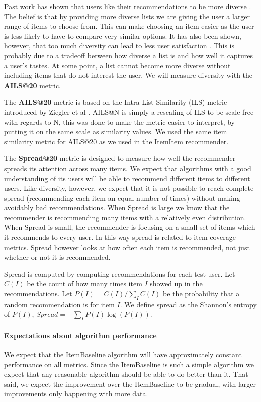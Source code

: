 \documentclass[letterpaper]{sig-alternate}
\begin{document}
  Past work has shown that users like their recommendations to be more diverse \cite{zieglerDiversity, martijnDiversity}.
  The belief is that by providing more diverse lists we are giving the user a larger range of items to choose from.
  This can make choosing an item easier as the user is less likely to have to compare very similar options.
  It has also been shown, however, that too much diversity can lead to less user satisfaction \cite{zieglerDiversity}.
  This is probably due to a tradeoff between how diverse a list is and how well it captures a user's tastes.
  At some point, a list cannot become more diverse without including items that do not interest the user.
  We will measure diversity with the {\bf AILS@20} metric.

  The {\bf AILS@20} metric is based on the Intra-List Similarity (ILS) metric introduced by Ziegler et al \cite{zieglerDiversity}.
  AILS@N is simply a rescaling of ILS to be scale free with regards to N, this was done to make the metric easier to interpret, by putting it on the same scale as similarity values.
  We used the same item similarity metric for AILS@20 as we used in the ItemItem recommender.

  The {\bf Spread@20} metric is designed to measure how well the recommender spreads its attention across many items.
  We expect that algorithms with a good understanding of its users will be able to recommend different items to different users.
  Like diversity, however, we expect that it is not possible to reach complete spread (recommending each item an equal number of times) without making avoidably bad recommendations.
  When Spread is large we know that the recommender is recommending many items with a relatively even distribution.
  When Spread is small, the recommender is focusing on a small set of items which it recommends to every user.
  In this way spread is related to item coverage metrics.
  Spread however looks at how often each item is recommended, not just whether or not it is recommended.

  Spread is computed by computing recommendations for each test user.
  Let $C(I)$ be the count of how many times item $I$ showed up in the recommendations.
  Let $P(I) = C(I) / \sum_I C(I)$ be the probability that a random recommendation is for item $I$.
  We define spread as the Shannon's entropy of $P(I)$, $Spread = -\sum_I P(I) \log(P(I))$.

  \paragraph{Expectations about algorithm performance}
  We expect that the ItemBaseline algorithm will have approximately constant performance on all metrics.
  Since the ItemBaseline is such a simple algorithm we expect that any reasonable algorithm should be able to do better than it.
  That said, we expect the improvement over the ItemBaseline to be gradual, with larger improvements only happening with more data.
\end{document}
